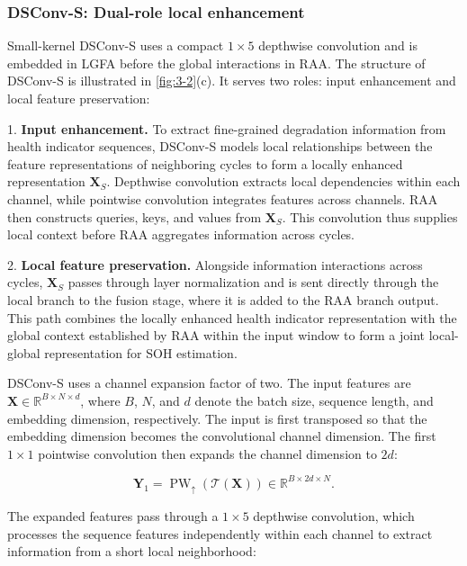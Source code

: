 \subsubsection{DSConv-S: Dual-role local enhancement}

Small-kernel DSConv-S uses a compact $1\times5$ depthwise convolution and is embedded in LGFA before the global interactions in RAA. The structure of DSConv-S is illustrated in \cref{fig:3-2}(c). It serves two roles: input enhancement and local feature preservation:

1. \textbf{Input enhancement.} To extract fine-grained degradation information from health indicator sequences, DSConv-S models local relationships between the feature representations of neighboring cycles to form a locally enhanced representation $\mathbf X_S$. Depthwise convolution extracts local dependencies within each channel, while pointwise convolution integrates features across channels. RAA then constructs queries, keys, and values from $\mathbf X_S$. This convolution thus supplies local context before RAA aggregates information across cycles.

2. \textbf{Local feature preservation.} Alongside information interactions across cycles, $\mathbf X_S$ passes through layer normalization and is sent directly through the local branch to the fusion stage, where it is added to the RAA branch output. This path combines the locally enhanced health indicator representation with the global context established by RAA within the input window to form a joint local-global representation for SOH estimation.

DSConv-S uses a channel expansion factor of two. The input features are $\mathbf X\in\mathbb R^{B\times N\times d}$, where $B$, $N$, and $d$ denote the batch size, sequence length, and embedding dimension, respectively. The input is first transposed so that the embedding dimension becomes the convolutional channel dimension. The first $1\times1$ pointwise convolution then expands the channel dimension to $2d$:

\begin{equation}
\mathbf Y_1
=
\operatorname{PW}_{\uparrow}
\left(
\mathcal T(\mathbf X)
\right)
\in\mathbb R^{B\times 2d\times N}.
\end{equation}

The expanded features pass through a $1\times5$ depthwise convolution, which processes the sequence features independently within each channel to extract information from a short local neighborhood:

